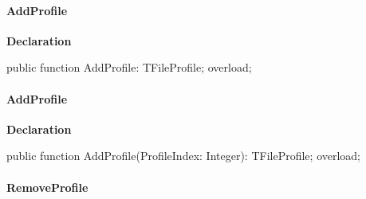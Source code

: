 \documentclass{report}
\newif\ifpdf
\begin{document}
\paragraph*{AddProfile}\hspace*{\fill}

\label{editor.TFileProfiles-AddProfile}
\begin{list}{}{
\setlength{\itemindent}{0cm}
\setlength{\listparindent}{0cm}
\setlength{\leftmargin}{\evensidemargin}
\addtolength{\leftmargin}{\tmplength}
\settowidth{\labelsep}{X}
\addtolength{\leftmargin}{\labelsep}
\setlength{\labelwidth}{\tmplength}
}
\item[\textbf{Declaration}\hfill]
\ifpdf
\begin{flushleft}
\fi
\begin{ttfamily}
public function AddProfile: TFileProfile; overload;\end{ttfamily}

\ifpdf
\end{flushleft}
\fi

\end{list}
\paragraph*{AddProfile}\hspace*{\fill}

\label{editor.TFileProfiles-AddProfile}
\begin{list}{}{
\setlength{\itemindent}{0cm}
\setlength{\listparindent}{0cm}
\setlength{\leftmargin}{\evensidemargin}
\addtolength{\leftmargin}{\tmplength}
\settowidth{\labelsep}{X}
\addtolength{\leftmargin}{\labelsep}
\setlength{\labelwidth}{\tmplength}
}
\item[\textbf{Declaration}\hfill]
\ifpdf
\begin{flushleft}
\fi
\begin{ttfamily}
public function AddProfile(ProfileIndex: Integer): TFileProfile; overload;\end{ttfamily}

\ifpdf
\end{flushleft}
\fi

\end{list}
\paragraph*{RemoveProfile}\hspace*{\fill}
\end{document}
